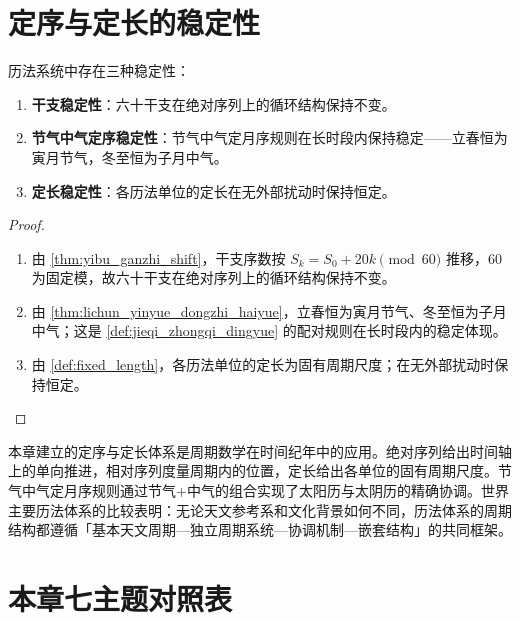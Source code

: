 \section{定序与定长的稳定性}
\label{sec:calendar_stability}

\begin{theorem}[历法定序与定长的稳定性]\label{thm:calendar_stability}
历法系统中存在三种稳定性：
\begin{enumerate}[label=(\roman*)]
    \item \textbf{干支稳定性}：六十干支在绝对序列上的循环结构保持不变。
    \item \textbf{节气中气定序稳定性}：节气中气定月序规则在长时段内保持稳定——立春恒为寅月节气，冬至恒为子月中气。
    \item \textbf{定长稳定性}：各历法单位的定长在无外部扰动时保持恒定。
\end{enumerate}
\end{theorem}

\begin{proof}
\begin{enumerate}[label=(\roman*)]
\item 由 \cref{thm:yibu_ganzhi_shift}，干支序数按 \(S_k=S_0+20k\pmod{60}\) 推移，\(60\) 为固定模，故六十干支在绝对序列上的循环结构保持不变。
\item 由 \cref{thm:lichun_yinyue_dongzhi_haiyue}，立春恒为寅月节气、冬至恒为子月中气；这是 \cref{def:jieqi_zhongqi_dingyue} 的配对规则在长时段内的稳定体现。
\item 由 \cref{def:fixed_length}，各历法单位的定长为固有周期尺度；在无外部扰动时保持恒定。
\end{enumerate}
\end{proof}

\begin{remark}[与全书的衔接]\label{rem:calendar_book_interface}
本章建立的定序与定长体系是周期数学在时间纪年中的应用。绝对序列给出时间轴上的单向推进，相对序列度量周期内的位置，定长给出各单位的固有周期尺度。节气中气定月序规则通过节气+中气的组合实现了太阳历与太阴历的精确协调。世界主要历法体系的比较表明：无论天文参考系和文化背景如何不同，历法体系的周期结构都遵循「基本天文周期—独立周期系统—协调机制—嵌套结构」的共同框架。
\end{remark}

\section*{本章七主题对照表}

